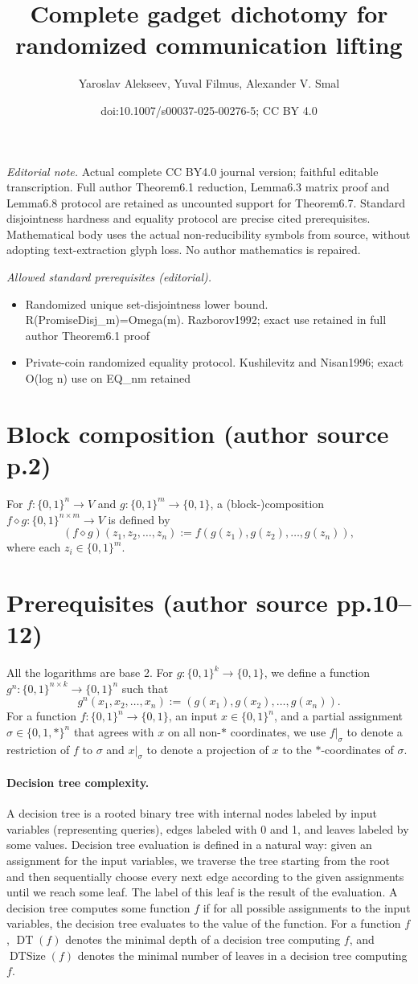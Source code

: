 \documentclass[10pt,a4paper]{article}
\title{Complete gadget dichotomy for randomized communication lifting}
\author{Yaroslav Alekseev, Yuval Filmus, Alexander V. Smal}
\date{doi:10.1007/s00037-025-00276-5; CC BY 4.0}
\newcommand{\bits}{\{0,1\}}
\newcommand{\DT}{\operatorname{DT}}
\newcommand{\DTSize}{\operatorname{DTSize}}
\newcommand{\comp}{\diamond}
\begin{document}
\maketitle
\noindent\textit{Editorial note.} Actual complete CC BY4.0 journal version; faithful editable transcription. Full author Theorem6.1 reduction, Lemma6.3 matrix proof and Lemma6.8 protocol are retained as uncounted support for Theorem6.7. Standard disjointness hardness and equality protocol are precise cited prerequisites. Mathematical body uses the actual non-reducibility symbols from source, without adopting text-extraction glyph loss. No author mathematics is repaired.\par\medskip
\noindent\textit{Allowed standard prerequisites (editorial).}\begin{itemize}
\item Randomized unique set-disjointness lower bound. R(PromiseDisj\_m)=Omega(m). Razborov1992; exact use retained in full author Theorem6.1 proof
\item Private-coin randomized equality protocol. Kushilevitz and Nisan1996; exact O(log n) use on EQ\_nm retained
\end{itemize}\medskip
\section*{Block composition (author source p.2)}
For $f:\bits^n\to V$ and $g:\bits^m\to\bits$, a (block-)composition $f\comp g:\bits^{n\times m}\to V$ is defined by
\[(f\comp g)(z_1,z_2,\ldots,z_n):=f(g(z_1),g(z_2),\ldots,g(z_n)),\]
where each $z_i\in\bits^m$.
\section*{Prerequisites (author source pp.10--12)}
All the logarithms are base 2. For $g:\bits^k\to\bits$, we define a function $g^n:\bits^{n\times k}\to\bits^n$ such that
\[g^n(x_1,x_2,\ldots,x_n):=(g(x_1),g(x_2),\ldots,g(x_n)).\]
For a function $f:\bits^n\to\bits$, an input $x\in\bits^n$, and a partial assignment $\sigma\in\{0,1,*\}^n$ that agrees with $x$ on all non-$*$ coordinates, we use $f|_\sigma$ to denote a restriction of $f$ to $\sigma$ and $x|_\sigma$ to denote a projection of $x$ to the $*$-coordinates of $\sigma$.
\paragraph{Decision tree complexity.} A decision tree is a rooted binary tree with internal nodes labeled by input variables (representing queries), edges labeled with 0 and 1, and leaves labeled by some values. Decision tree evaluation is defined in a natural way: given an assignment for the input variables, we traverse the tree starting from the root and then sequentially choose every next edge according to the given assignments until we reach some leaf. The label of this leaf is the result of the evaluation. A decision tree computes some function $f$ if for all possible assignments to the input variables, the decision tree evaluates to the value of the function. For a function $f$, $\DT(f)$ denotes the minimal depth of a decision tree computing $f$, and $\DTSize(f)$ denotes the minimal number of leaves in a decision tree computing $f$.
\end{document}
